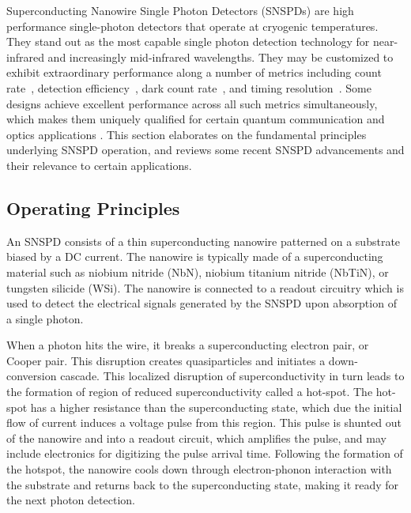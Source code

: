 \documentclass[11pt]{caltech_thesis} %
\begin{document}
Superconducting Nanowire Single Photon Detectors (SNSPDs) are high performance single-photon detectors that operate at cryogenic temperatures. They stand out as the most capable single photon detection technology for near-infrared and increasingly mid-infrared wavelengths. They may be customized to exhibit extraordinary performance along a number of metrics including count rate~\autocite{Craiciu23}, detection efficiency~\autocite{marsili2013detecting,reddy2020superconducting,5_Chang_2021}, dark count rate~\autocite{Shibata2015,Mueller:21}, and timing resolution~\autocite{Korzh2020}. Some designs achieve excellent performance across all such metrics simultaneously, which makes them uniquely qualified for certain quantum communication and optics applications \autocite{Colangelo2023}. This section elaborates on the fundamental principles underlying SNSPD operation, and reviews some recent SNSPD advancements and their relevance to certain applications.

\hypertarget{operating-principles}{%
\subsection{Operating Principles}\label{operating-principles}}

An SNSPD consists of a thin superconducting nanowire patterned on a substrate biased by a DC current. The nanowire is typically made of a superconducting material such as niobium nitride (NbN), niobium titanium nitride (NbTiN), or tungsten silicide (WSi). The nanowire is connected to a readout circuitry which is used to detect the electrical signals generated by the SNSPD upon absorption of a single photon.

When a photon hits the wire, it breaks a superconducting electron pair, or Cooper pair. This disruption creates quasiparticles and initiates a down-conversion cascade. This localized disruption of superconductivity in turn leads to the formation of region of reduced superconductivity called a hot-spot. The hot-spot has a higher resistance than the superconducting state, which due the initial flow of current induces a voltage pulse from this region. This pulse is shunted out of the nanowire and into a readout circuit, which amplifies the pulse, and may include electronics for digitizing the pulse arrival time. Following the formation of the hotspot, the nanowire cools down through electron-phonon interaction with the substrate and returns back to the superconducting state, making it ready for the next photon detection.
\end{document}
